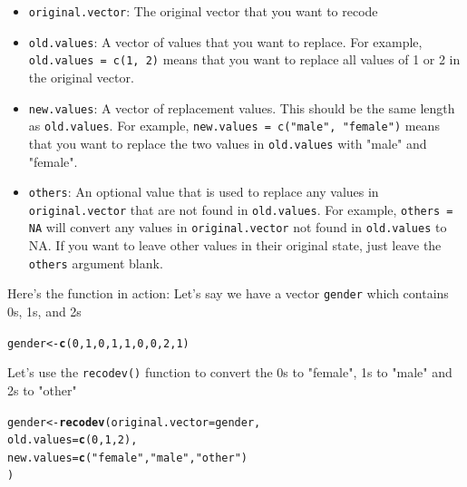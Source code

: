 \documentclass{tufte-book}\usepackage[]{graphicx}\usepackage[]{color}
\makeatletter
\newcommand{\hlnum}[1]{\textcolor[rgb]{0.686,0.059,0.569}{#1}}%
\newcommand{\hlstr}[1]{\textcolor[rgb]{0.192,0.494,0.8}{#1}}%
\newcommand{\hlstd}[1]{\textcolor[rgb]{0.345,0.345,0.345}{#1}}%
\newcommand{\hlkwb}[1]{\textcolor[rgb]{0.69,0.353,0.396}{#1}}%
\newcommand{\hlkwc}[1]{\textcolor[rgb]{0.333,0.667,0.333}{#1}}%
\newcommand{\hlkwd}[1]{\textcolor[rgb]{0.737,0.353,0.396}{\textbf{#1}}}%
\newenvironment{kframe}{%
 \def\at@end@of@kframe{}%
 \ifinner\ifhmode%
  \def\at@end@of@kframe{\end{minipage}}%
  \begin{minipage}{\columnwidth}%
 \fi\fi%
 \def\FrameCommand##1{\hskip\@totalleftmargin \hskip-\fboxsep
 \colorbox{shadecolor}{##1}\hskip-\fboxsep
     \hskip-\linewidth \hskip-\@totalleftmargin \hskip\columnwidth}%
 \MakeFramed {\advance\hsize-\width
   \@totalleftmargin\z@ \linewidth\hsize
   \@setminipage}}%
 {\par\unskip\endMakeFramed%
 \at@end@of@kframe}
\newenvironment{knitrout}{}{} %
\makeatother
\begin{document}
\begin{itemize}

 \item \texttt{original.vector}: The original vector that you want to recode
 \item \texttt{old.values}: A vector of values that you want to replace. For example, \texttt{old.values = c(1, 2)} means that you want to replace all values of 1 or 2 in the original vector.
 \item \texttt{new.values}: A vector of replacement values. This should be the same length as \texttt{old.values}. For example, \texttt{new.values = c("male", "female")} means that you want to replace the two values in \texttt{old.values} with "male" and "female".
 \item \texttt{others}: An optional value that is used to replace any values in \texttt{original.vector} that are not found in \texttt{old.values}. For example, \texttt{others = NA} will convert any values in \texttt{original.vector} not found in \texttt{old.values} to NA. If you want to leave other values in their original state, just leave the \texttt{others} argument blank.

\end{itemize}



Here's the function in action: Let's say we have a vector \texttt{gender} which contains 0s, 1s, and 2s

\begin{knitrout}
\color{fgcolor}\begin{kframe}
\begin{alltt}
\hlstd{gender} \hlkwb{<-} \hlkwd{c}\hlstd{(}\hlnum{0}\hlstd{,} \hlnum{1}\hlstd{,} \hlnum{0}\hlstd{,} \hlnum{1}\hlstd{,} \hlnum{1}\hlstd{,} \hlnum{0}\hlstd{,} \hlnum{0}\hlstd{,} \hlnum{2}\hlstd{,} \hlnum{1}\hlstd{)}
\end{alltt}
\end{kframe}
\end{knitrout}

Let's use the \texttt{recodev()} function to convert the 0s to "female", 1s to "male" and 2s to "other"

\begin{footnotesize}
\begin{knitrout}
\color{fgcolor}\begin{kframe}
\begin{alltt}
\hlstd{gender} \hlkwb{<-} \hlkwd{recodev}\hlstd{(}\hlkwc{original.vector} \hlstd{= gender,}
         \hlkwc{old.values} \hlstd{=} \hlkwd{c}\hlstd{(}\hlnum{0}\hlstd{,} \hlnum{1}\hlstd{,} \hlnum{2}\hlstd{),}
         \hlkwc{new.values} \hlstd{=} \hlkwd{c}\hlstd{(}\hlstr{"female"}\hlstd{,} \hlstr{"male"}\hlstd{,} \hlstr{"other"}\hlstd{)}
\hlstd{)}
\end{alltt}
\end{kframe}
\end{knitrout}
\end{footnotesize}
\end{document}
